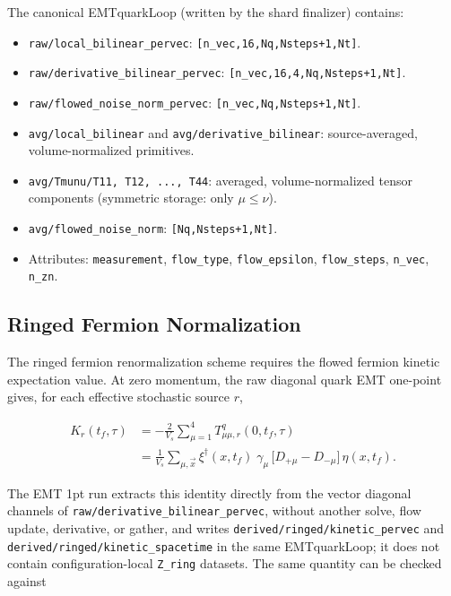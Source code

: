 \documentclass[11pt,a4paper]{article}
\newcommand{\code}[1]{\texttt{#1}}
\begin{document}
The canonical EMTquarkLoop (written by the shard finalizer) contains:

\begin{itemize}[nosep]
  \item \code{raw/local\_bilinear\_pervec}: \code{[n\_vec,16,Nq,Nsteps+1,Nt]}.
  \item \code{raw/derivative\_bilinear\_pervec}: \code{[n\_vec,16,4,Nq,Nsteps+1,Nt]}.
  \item \code{raw/flowed\_noise\_norm\_pervec}: \code{[n\_vec,Nq,Nsteps+1,Nt]}.
  \item \code{avg/local\_bilinear} and \code{avg/derivative\_bilinear}: source-averaged, volume-normalized primitives.
  \item \code{avg/Tmunu/T11, T12, ..., T44}: averaged, volume-normalized tensor components (symmetric storage: only $\mu \leq \nu$).
  \item \code{avg/flowed\_noise\_norm}: \code{[Nq,Nsteps+1,Nt]}.
  \item Attributes: \code{measurement}, \code{flow\_type}, \code{flow\_epsilon}, \code{flow\_steps}, \code{n\_vec}, \code{n\_zn}.
\end{itemize}

\subsection{Ringed Fermion Normalization}
\label{sec:ringed_fermion}

The ringed fermion renormalization scheme \cite{Makino:2016} requires the
flowed fermion kinetic expectation value.  At zero momentum, the raw diagonal
quark EMT one-point gives, for each effective stochastic source \(r\),

\begin{align}\label{eq:ringed_norm}
  K_r(t_f,\tau)
    &= -\frac{2}{V_s}\sum_{\mu=1}^4
       T_{\mu\mu,r}^q(0,t_f,\tau) \\
    &= \frac{1}{V_s}\sum_{\mu,\vec{x}}
       \xi^\dagger(x,t_f)\;
       \gamma_\mu\,
       \big[ D_{+\mu} - D_{-\mu} \big]\,
       \eta(x,t_f).
\end{align}

The EMT 1pt run extracts this identity directly from
the vector diagonal channels of
\code{raw/derivative\_bilinear\_pervec}, without another solve, flow update, derivative, or
gather, and writes \code{derived/ringed/kinetic\_pervec} and
\code{derived/ringed/kinetic\_spacetime} in the same EMTquarkLoop; it does not contain
configuration-local \code{Z\_ring} datasets.  The same quantity can be checked
against
\end{document}
